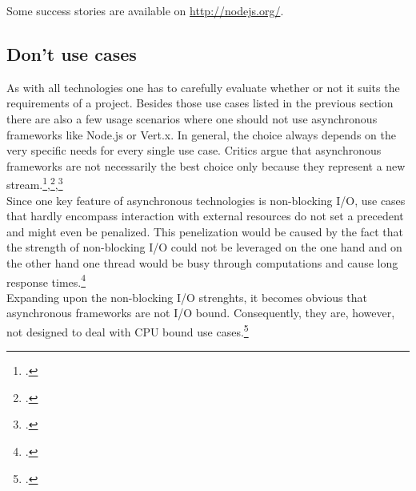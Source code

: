 Some success stories are available on \url{http://nodejs.org/}.

\subsection{Don't use cases}
\label{dont_use_cases}

As with all technologies one has to carefully evaluate whether or not it suits the
requirements of a project. Besides those use cases listed in the previous
section there are also a few usage scenarios where one should not use
asynchronous frameworks like Node.js or Vert.x. In general, the choice
always depends on the very specific needs for every single use case.
Critics argue that asynchronous frameworks are not necessarily the best choice
only because they represent a new stream.\footcite[Cf.][]{semerau_2011},\footcite[Cf.][]{arranz_2011},\footcite[Cf.][]{behren_2003}\\

Since one key feature of asynchronous technologies is non-blocking I/O, use
cases that hardly encompass interaction with external resources do not set a
precedent and might even be penalized. This penelization would be caused by the
fact that the strength of non-blocking I/O could not be leveraged on the one
hand and on the other hand one thread would be busy through computations and
cause long response times.\footcite[Cf.][14]{Roden_2012}\\

Expanding upon the non-blocking I/O strenghts, it becomes obvious that
asynchronous frameworks are not I/O bound. Consequently, they are, however, not
designed to deal with CPU bound use cases.\footcite[Cf.][15]{Nguyen_2012}\\

